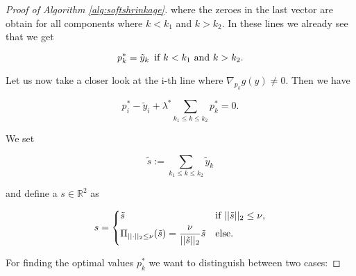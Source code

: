\begin{proof}[Proof of Algorithm \ref{alg:softshrinkage}]
        where the zeroes in the last vector are obtain for all components where $k < k_{1}$ and $k > k_{2}$. In these lines we already see that we get

            $$p^{\ast}_{k} = \tilde{y}_{k} \,\,\, \textnormal{if} \,\, k < k_{1} \,\, \textnormal{and} \,\, k > k_{2}.$$

        Let us now take a closer look at the i-th line where $\nabla_{p_{k}} g(y) \ne 0$. Then we have

            \begin{equation}
                p^{\ast}_{i} - \tilde{y}_{i} + \lambda^{\ast} \sum_{k_{1} \le k \le k_{2}} p^{\ast}_{k} = 0. \label{eq:ithRow}
            \end{equation}

        We set %



            $$\tilde{s} := \sum\limits_{k_{1} \le k \le k_{2}} \tilde{y}_{k}$$

        and define a $s \in \mathbb{R}^{2}$ as

            \[
                s =
                    \begin{dcases*}
                        \tilde{s} & \textnormal{if $||\tilde{s}||_{2} \le \nu$},\\
                        \Pi_{||\cdot||_{2} \le \nu}(\tilde{s}) = \frac{\nu}{||\tilde{s}||_{2}} \tilde{s} & \textnormal{else}.
                    \end{dcases*}
            \]

        \newpage

        For finding the optimal values $p^{\ast}_{k}$ we want to distinguish between two cases:


\end{proof}
